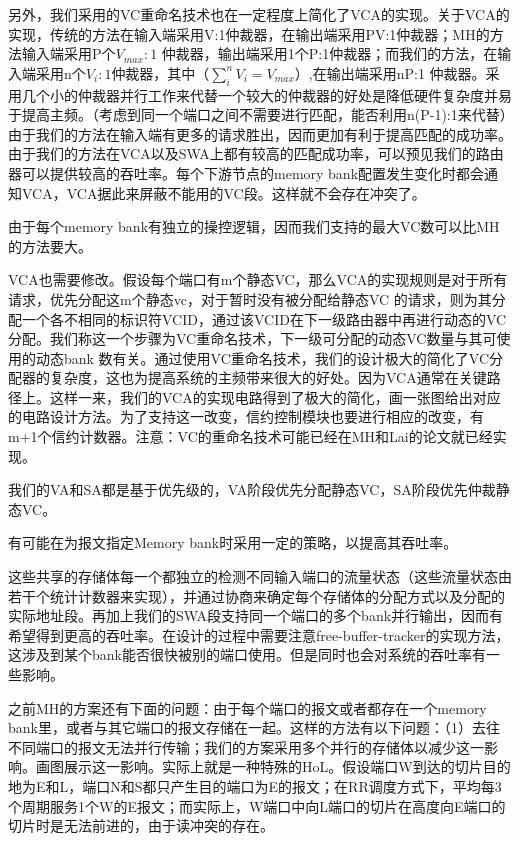\documentclass[10pt,journal]{IEEEtran}
\begin{document}
另外，我们采用的VC重命名技术也在一定程度上简化了VCA的实现。关于VCA的实现，传统的方法在输入端采用V:1仲裁器，在输出端采用PV:1仲裁器；MH的方法输入端采用P个$V_{max}:1$ 仲裁器，输出端采用1个P:1仲裁器；而我们的方法，在输入端采用n个$V_i:1$仲裁器，其中（$\sum_{i}^nV_i=V_{max}$）,在输出端采用nP:1 仲裁器。采用几个小的仲裁器并行工作来代替一个较大的仲裁器的好处是降低硬件复杂度并易于提高主频。（考虑到同一个端口之间不需要进行匹配，能否利用n(P-1):1来代替）由于我们的方法在输入端有更多的请求胜出，因而更加有利于提高匹配的成功率。由于我们的方法在VCA以及SWA上都有较高的匹配成功率，可以预见我们的路由器可以提供较高的吞吐率。每个下游节点的memory bank配置发生变化时都会通知VCA，VCA据此来屏蔽不能用的VC段。这样就不会存在冲突了。

由于每个memory bank有独立的操控逻辑，因而我们支持的最大VC数可以比MH的方法要大。

VCA也需要修改。假设每个端口有m个静态VC，那么VCA的实现规则是对于所有请求，优先分配这m个静态vc，对于暂时没有被分配给静态VC 的请求，则为其分配一个各不相同的标识符VCID，通过该VCID在下一级路由器中再进行动态的VC分配。我们称这一个步骤为VC重命名技术，下一级可分配的动态VC数量与其可使用的动态bank 数有关。通过使用VC重命名技术，我们的设计极大的简化了VC分配器的复杂度，这也为提高系统的主频带来很大的好处。因为VCA通常在关键路径上。这样一来，我们的VCA的实现电路得到了极大的简化，画一张图给出对应的电路设计方法。为了支持这一改变，信约控制模块也要进行相应的改变，有m+1个信约计数器。注意：VC的重命名技术可能已经在MH和Lai的论文就已经实现。

我们的VA和SA都是基于优先级的，VA阶段优先分配静态VC，SA阶段优先仲裁静态VC。

有可能在为报文指定Memory bank时采用一定的策略，以提高其吞吐率。

这些共享的存储体每一个都独立的检测不同输入端口的流量状态（这些流量状态由若干个统计计数器来实现），并通过协商来确定每个存储体的分配方式以及分配的实际地址段。再加上我们的SWA段支持同一个端口的多个bank并行输出，因而有希望得到更高的吞吐率。在设计的过程中需要注意free-buffer-tracker的实现方法，这涉及到某个bank能否很快被别的端口使用。但是同时也会对系统的吞吐率有一些影响。

之前MH的方案还有下面的问题：由于每个端口的报文或者都存在一个memory bank里，或者与其它端口的报文存储在一起。这样的方法有以下问题：（1）去往不同端口的报文无法并行传输；我们的方案采用多个并行的存储体以减少这一影响。画图展示这一影响。实际上就是一种特殊的HoL。假设端口W到达的切片目的地为E和L，端口N和S都只产生目的端口为E的报文；在RR调度方式下，平均每3个周期服务1个W的E报文；而实际上，W端口中向L端口的切片在高度向E端口的切片时是无法前进的，由于读冲突的存在。
\end{document}

